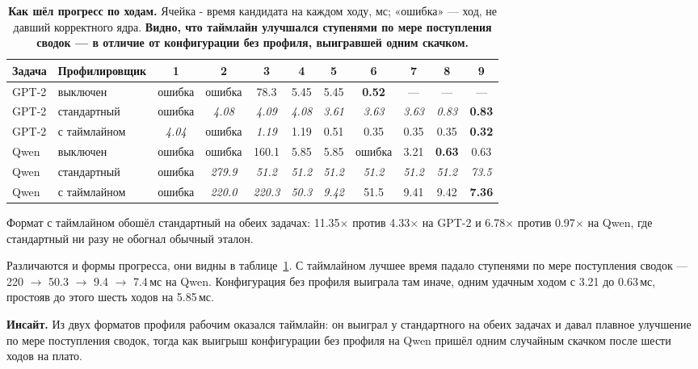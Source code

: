 \documentclass[10pt,a4paper]{article}
\newcommand{\insight}[1]{\par\smallskip\noindent\textbf{Инсайт.} #1\par\smallskip}
\begin{document}
\begin{table}[h]
\centering\footnotesize
\caption{\textbf{Как шёл прогресс по ходам.} Ячейка - время кандидата на каждом ходу, мс; «ошибка» ---
ход, не давший корректного ядра. \textbf{Видно, что  таймлайн улучшался ступенями по мере поступления сводок --- в отличие
от конфигурации без профиля, выигравшей одним скачком.}}
\label{tab:prof9traj}
\begin{tabular}{llccccccccc}
\toprule
Задача & Профилировщик & 1 & 2 & 3 & 4 & 5 & 6 & 7 & 8 & 9 \\
\midrule
GPT-2 & выключен      & ошибка & ошибка & 78.3 & 5.45 & 5.45 & \textbf{0.52} & --- & --- & --- \\
GPT-2 & стандартный   & ошибка & \emph{4.08} & \emph{4.09} & \emph{4.08} & \emph{3.61} & \emph{3.63} & \emph{3.63} & \emph{0.83} & \textbf{0.83} \\
GPT-2 & с таймлайном  & \emph{4.04} & ошибка & \emph{1.19} & 1.19 & 0.51 & 0.35 & 0.35 & 0.35 & \textbf{0.32} \\
\midrule
Qwen & выключен       & ошибка & ошибка & 160.1 & 5.85 & 5.85 & ошибка & 3.21 & \textbf{0.63} & 0.63 \\
Qwen & стандартный    & ошибка & \emph{279.9} & \emph{51.2} & \emph{51.2} & \emph{51.2} & \emph{51.2} & \emph{51.2} & \emph{51.2} & \emph{73.5} \\
Qwen & с таймлайном   & ошибка & \emph{220.0} & \emph{220.3} & \emph{50.3} & \emph{9.42} & 51.5 & 9.41 & 9.42 & \textbf{7.36} \\
\bottomrule
\end{tabular}
\end{table}

Формат с таймлайном обошёл стандартный на обеих задачах: 11.35$\times$ против 4.33$\times$ на
GPT-2 и 6.78$\times$ против 0.97$\times$ на Qwen, где стандартный ни разу не обогнал обычный
эталон. 

Различаются и формы прогресса, они видны в таблице~\ref{tab:prof9traj}. С таймлайном лучшее
время падало ступенями по мере поступления сводок --- 220 $\to$ 50.3 $\to$ 9.4 $\to$ 7.4\,мс
на Qwen. Конфигурация без профиля выиграла там иначе, одним удачным ходом с 3.21 до 0.63\,мс,
простояв до этого шесть ходов на 5.85\,мс.

\insight{Из двух форматов профиля рабочим оказался таймлайн: он выиграл у стандартного на обеих
задачах и давал плавное улучшение по мере поступления сводок, тогда как выигрыш конфигурации
без профиля на Qwen пришёл одним случайным скачком после шести ходов на плато.}
\end{document}
